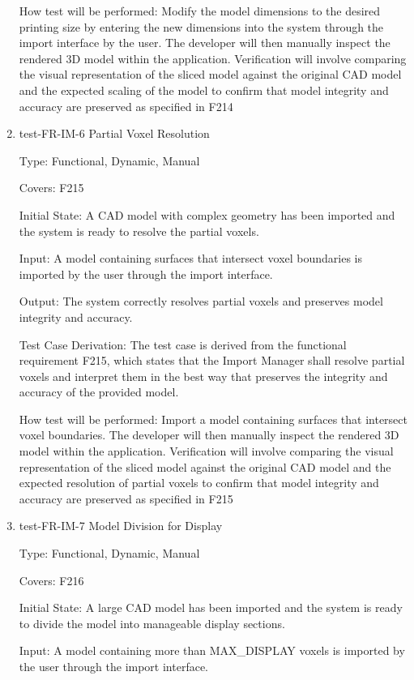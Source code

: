 \documentclass[12pt, titlepage]{article}
\begin{document}
\begin{enumerate}
How test will be performed: Modify the model dimensions to the desired printing size by entering the new dimensions into the system through the import interface by the user. The developer will then manually inspect the rendered 3D model within the application. Verification will involve comparing the visual representation of the sliced model against the original CAD model and the expected scaling of the model to confirm that model integrity and accuracy are preserved as specified in F214

\item{test-FR-IM-6 Partial Voxel Resolution\\}

Type: Functional, Dynamic, Manual

Covers: F215
					
Initial State: A CAD model with complex geometry has been imported and the system is ready to resolve the partial voxels.
					
Input: A model containing surfaces that intersect voxel boundaries is imported by the user through the import interface.
					
Output: The system correctly resolves partial voxels and preserves model integrity and accuracy.

Test Case Derivation: The test case is derived from the functional requirement F215, which states that the Import Manager shall resolve partial voxels and interpret them in the best way that preserves the integrity and accuracy of the provided model.
					
How test will be performed: Import a model containing surfaces that intersect voxel boundaries. The developer will then manually inspect the rendered 3D model within the application. Verification will involve comparing the visual representation of the sliced model against the original CAD model and the expected resolution of partial voxels to confirm that model integrity and accuracy are preserved as specified in F215

\item{test-FR-IM-7 Model Division for Display\\}

Type: Functional, Dynamic, Manual

Covers: F216
					
Initial State: A large CAD model has been imported and the system is ready to divide the model into manageable display sections.
					
Input: A model containing more than MAX\_DISPLAY voxels is imported by the user through the import interface.
					

\end{enumerate}
\end{document}
